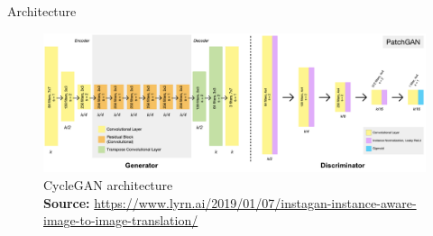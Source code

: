\documentclass[12pt]{beamer}
\newcommand{\captionsource}[2]{
    \captionsetup{justification=centering}
    \caption*{#1\\\scriptsize\textbf{Source:} \url{#2}}
}
\begin{document}
    \begin{frame}{Architecture}
        \begin{figure}[H]
            \centering
            \includegraphics[scale=0.26]{resources/cycle-gan/gan-architecture.png}
            \captionsource{CycleGAN architecture}{https://www.lyrn.ai/2019/01/07/instagan-instance-aware-image-to-image-translation/}
        \end{figure}
    \end{frame}
    
\end{document}
